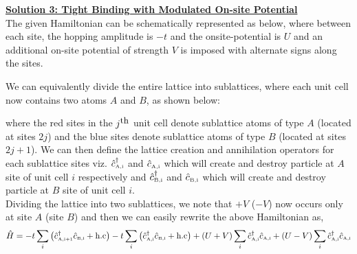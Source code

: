\documentclass[usenames, svgnames, dvipsnames]{scrartcl}
\newcommand{\crai}{\hat{c}\tund{A,i}^\dagger}
\newcommand{\annai}{\hat{c}\tund{A,i}}
\newcommand{\annbi}{\hat{c}\tund{B,i}}
\newcommand{\craip}{\hat{c}\tund{A,i+1}^\dagger}
\newcommand{\tund}[1]{_{\text{\tiny #1}}}
\begin{document}
\noindent
\underline{\textbf{{\sffamily Solution 3: Tight Binding with Modulated On-site Potential}}}
\\[0.2cm]

    
\noindent
The given Hamiltonian can be schematically represented as below, where between each site, the hopping amplitude is $-t$ and the onsite-potential is $U$ and an additional on-site potential of strength $V$ is imposed with alternate signs along the sites. 
\begin{figure}[H]
    \centering
    
\end{figure}
\noindent
We can equivalently divide the entire lattice into sublattices, where each unit cell now contains two atoms $A$ and $B$, as shown below: 
\begin{figure}[H]
    \centering
    
\end{figure}\noindent
where the red sites in the $j^{\text{\small th}}$ unit cell denote sublattice atoms of type $A$ (located at sites $2j$) and the blue sites denote sublattice atoms of type $B$ (located at sites $2j+1$). We can then define the lattice creation and annihilation operators for each sublattice sites viz. $\hat{c}\tund{A,i}^\dagger$ and $\hat{c}\tund{A,i}$ which will create and destroy particle at $A$ site of unit cell $i$ respectively and $\hat{c}\tund{B,i}^\dagger$ and $\hat{c}\tund{B,i}$ which will create and destroy particle at $B$ site of unit cell $i$. \\[0.2cm]
Dividing the lattice into two sublattices, we note that $+V$ ($-V$) now occurs only at site $A$ (site $B$) and then we can easily rewrite the above Hamiltonian as,
\begin{align*}
    \hat{H} = -t\sum\limits_{i}\qty(\craip \annbi + \text{h.c})  -t\sum\limits_{i}\qty(\crai \annbi + \text{h.c})  + (U+V)\sum\limits_{i}\crai \annai+(U-V)\sum\limits_{i}\crai \annai 
\end{align*} 
\end{document}

